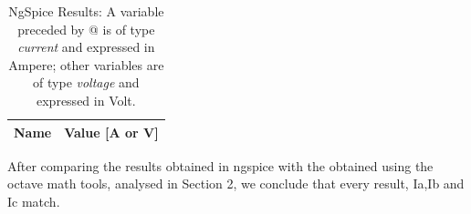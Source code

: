 \begin{table}[!htb]
  \centering
  \begin{tabular}{|l|r|}
    \hline    
    {\bf Name} & {\bf Value [A or V]} \\ \hline
    
  \end{tabular}
  \caption{NgSpice Results: A variable preceded by @ is of type {\em current} and expressed in Ampere; other variables are of type {\it voltage} and expressed in
    Volt.}
  \label{tab:op}
\end{table}

After comparing the results obtained in ngspice with the obtained using the octave math tools, analysed in Section 2, we conclude that every result, Ia,Ib and Ic match.


